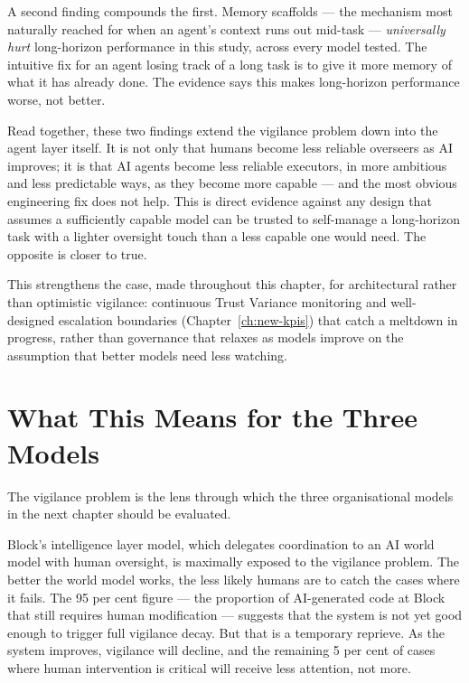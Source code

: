 A second finding compounds the first. Memory scaffolds --- the mechanism most naturally reached for when an agent's context runs out mid-task --- \emph{universally hurt} long-horizon performance in this study, across every model tested. The intuitive fix for an agent losing track of a long task is to give it more memory of what it has already done. The evidence says this makes long-horizon performance worse, not better.

\begin{cautionbox}[title={Trust-the-Model Optimism Is Not a Strategy}]
Read together, these two findings extend the vigilance problem down into the agent layer itself. It is not only that humans become less reliable overseers as AI improves; it is that AI agents become less reliable executors, in more ambitious and less predictable ways, as they become more capable --- and the most obvious engineering fix does not help. This is direct evidence against any design that assumes a sufficiently capable model can be trusted to self-manage a long-horizon task with a lighter oversight touch than a less capable one would need. The opposite is closer to true.

This strengthens the case, made throughout this chapter, for architectural rather than optimistic vigilance: continuous Trust Variance monitoring and well-designed escalation boundaries (Chapter~\ref{ch:new-kpis}) that catch a meltdown in progress, rather than governance that relaxes as models improve on the assumption that better models need less watching.
\end{cautionbox}

\section{What This Means for the Three Models}

The vigilance problem is the lens through which the three organisational models in the next chapter should be evaluated.

Block's intelligence layer model, which delegates coordination to an AI world model with human oversight, is maximally exposed to the vigilance problem. The better the world model works, the less likely humans are to catch the cases where it fails. The 95 per cent figure --- the proportion of AI-generated code at Block that still requires human modification --- suggests that the system is not yet good enough to trigger full vigilance decay. But that is a temporary reprieve. As the system improves, vigilance will decline, and the remaining 5 per cent of cases where human intervention is critical will receive less attention, not more.

